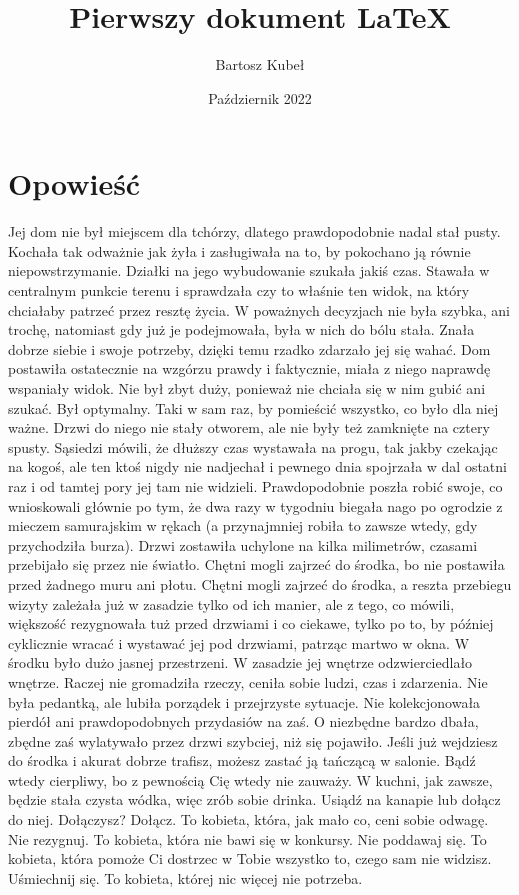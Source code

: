 \documentclass[12pt, letterpaper, titlepage]{article}
\title{Pierwszy dokument LaTeX}
\author{Bartosz Kubeł}
\date{Październik 2022}
\begin{document}
\maketitle
\section{Opowieść} \begin{center}
Jej dom nie był miejscem dla tchórzy, dlatego prawdopodobnie nadal stał pusty. Kochała tak odważnie jak żyła i zasługiwała na to, by pokochano ją równie niepowstrzymanie. Działki na jego wybudowanie szukała jakiś czas. Stawała w centralnym punkcie terenu i sprawdzała czy to właśnie ten widok, na który chciałaby patrzeć przez resztę życia. W poważnych decyzjach nie była szybka, ani trochę, natomiast gdy już je podejmowała, była w nich do bólu stała. Znała dobrze siebie i swoje potrzeby, dzięki temu rzadko zdarzało jej się wahać. Dom postawiła ostatecznie na wzgórzu prawdy i faktycznie, miała z niego naprawdę wspaniały widok. Nie był zbyt duży, ponieważ nie chciała się w nim gubić ani szukać. Był optymalny. Taki w sam raz, by pomieścić wszystko, co było dla niej ważne. Drzwi do niego nie stały otworem, ale nie były też zamknięte na cztery spusty. Sąsiedzi mówili, że dłuższy czas wystawała na progu, tak jakby czekając na kogoś, ale ten ktoś nigdy nie nadjechał i pewnego dnia spojrzała w dal ostatni raz i od tamtej pory jej tam nie widzieli. Prawdopodobnie poszła robić swoje, co wnioskowali głównie po tym, że dwa razy w tygodniu biegała nago po ogrodzie z mieczem samurajskim w rękach (a przynajmniej robiła to zawsze wtedy, gdy przychodziła burza). Drzwi zostawiła uchylone na kilka milimetrów, czasami przebijało się przez nie światło. Chętni mogli zajrzeć do środka, bo nie postawiła przed żadnego muru ani płotu. Chętni mogli zajrzeć do środka, a reszta przebiegu wizyty zależała już w zasadzie tylko od ich manier, ale z tego, co mówili, większość rezygnowała tuż przed drzwiami i co ciekawe, tylko po to, by później cyklicznie wracać i wystawać jej pod drzwiami, patrząc martwo w okna. W środku było dużo jasnej przestrzeni. W zasadzie jej wnętrze odzwierciedlało wnętrze. Raczej nie gromadziła rzeczy, ceniła sobie ludzi, czas i zdarzenia. Nie była pedantką, ale lubiła porządek i przejrzyste sytuacje. Nie kolekcjonowała pierdół ani prawdopodobnych przydasiów na zaś. O niezbędne bardzo dbała, zbędne zaś wylatywało przez drzwi szybciej, niż się pojawiło. Jeśli już wejdziesz do środka i akurat dobrze trafisz, możesz zastać ją tańczącą w salonie. Bądź wtedy cierpliwy, bo z pewnością Cię wtedy nie zauważy. W kuchni, jak zawsze, będzie stała czysta wódka, więc zrób sobie drinka. Usiądź na kanapie lub dołącz do niej. Dołączysz? Dołącz. To kobieta, która, jak mało co, ceni sobie odwagę. Nie rezygnuj. To kobieta, która nie bawi się w konkursy. Nie poddawaj się. To kobieta, która pomoże Ci dostrzec w Tobie wszystko to, czego sam nie widzisz. Uśmiechnij się. To kobieta, której nic więcej nie potrzeba.
\end{center}
\end{document}
